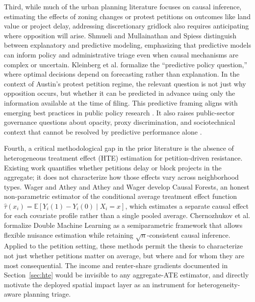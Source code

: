 \documentclass[twoside,11pt]{article}
\begin{document}
Third, while much of the urban planning literature focuses on causal inference, estimating the effects of zoning changes or protest petitions on outcomes like land value or project delay, addressing discretionary gridlock also requires anticipating where opposition will arise. Shmueli \cite{shmueli2010} and Mullainathan and Spiess \cite{mullainathan2017ml} distinguish between explanatory and predictive modeling, emphasizing that predictive models can inform policy and administrative triage even when causal mechanisms are complex or uncertain. Kleinberg et al. \cite{kleinberg2015prediction} formalize the ``predictive policy question,'' where optimal decisions depend on forecasting rather than explanation. In the context of Austin's protest petition regime, the relevant question is not just why opposition occurs, but whether it can be predicted in advance using only the information available at the time of filing. This predictive framing aligns with emerging best practices in public policy research \cite{athey2019ml}. It also raises public-sector governance questions about opacity, proxy discrimination, and sociotechnical context that cannot be resolved by predictive performance alone \cite{eubanks2018,oneil2016weapons,barocas2016,selbst2019fairness}.

Fourth, a critical methodological gap in the prior literature is the absence of heterogeneous treatment effect (HTE) estimation for petition-driven resistance. Existing work quantifies whether petitions delay or block projects in the aggregate; it does not characterize how those effects vary across neighborhood types. Wager and Athey \cite{wager2018estimation} and Athey and Wager \cite{athey2019generalized} develop Causal Forests, an honest non-parametric estimator of the conditional average treatment effect function $\hat{\tau}(x_i) = \mathbb{E}[Y_i(1) - Y_i(0) \mid X_i = x]$, which estimates a separate causal effect for each covariate profile rather than a single pooled average. Chernozhukov et al. \cite{chernozhukov2018dml} formalize Double Machine Learning as a semiparametric framework that allows flexible nuisance estimation while retaining $\sqrt{n}$-consistent causal inference. Applied to the petition setting, these methods permit the thesis to characterize not just whether petitions matter on average, but where and for whom they are most consequential. The income and renter-share gradients documented in Section~\ref{sec:hte} would be invisible to any aggregate-ATE estimator, and directly motivate the deployed spatial impact layer as an instrument for heterogeneity-aware planning triage.
\end{document}
